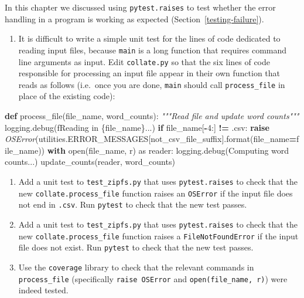 \documentclass[
]{krantz}
\makeatletter
\newenvironment{Shaded}{\begin{snugshade}}{\end{snugshade}}
\newcommand{\BuiltInTok}[1]{#1}
\newcommand{\CommentTok}[1]{\textcolor[rgb]{0.56,0.35,0.01}{\textit{#1}}}
\newcommand{\ControlFlowTok}[1]{\textcolor[rgb]{0.13,0.29,0.53}{\textbf{#1}}}
\newcommand{\DecValTok}[1]{\textcolor[rgb]{0.00,0.00,0.81}{#1}}
\newcommand{\ImportTok}[1]{#1}
\newcommand{\KeywordTok}[1]{\textcolor[rgb]{0.13,0.29,0.53}{\textbf{#1}}}
\newcommand{\NormalTok}[1]{#1}
\newcommand{\OperatorTok}[1]{\textcolor[rgb]{0.81,0.36,0.00}{\textbf{#1}}}
\newcommand{\PreprocessorTok}[1]{\textcolor[rgb]{0.56,0.35,0.01}{\textit{#1}}}
\newcommand{\SpecialCharTok}[1]{\textcolor[rgb]{0.00,0.00,0.00}{#1}}
\newcommand{\SpecialStringTok}[1]{\textcolor[rgb]{0.31,0.60,0.02}{#1}}
\newcommand{\StringTok}[1]{\textcolor[rgb]{0.31,0.60,0.02}{#1}}
\providecommand{\tightlist}{%
  \setlength{\itemsep}{0pt}\setlength{\parskip}{0pt}}
\newenvironment{kframe}{%
\medskip{}
\setlength{\fboxsep}{.8em}
 \def\at@end@of@kframe{}%
 \ifinner\ifhmode%
  \def\at@end@of@kframe{\end{minipage}}%
  \begin{minipage}{\columnwidth}%
 \fi\fi%
 \def\FrameCommand##1{\hskip\@totalleftmargin \hskip-\fboxsep
 \colorbox{shadecolor}{##1}\hskip-\fboxsep
     \hskip-\linewidth \hskip-\@totalleftmargin \hskip\columnwidth}%
 \MakeFramed {\advance\hsize-\width
   \@totalleftmargin\z@ \linewidth\hsize
   \@setminipage}}%
 {\par\unskip\endMakeFramed%
 \at@end@of@kframe}
\renewenvironment{Shaded}{\begin{kframe}}{\end{kframe}}
\makeatother
\begin{document}
In this chapter we discussed using \texttt{pytest.raises}
to test whether the error handling in a program is working as expected (Section~\ref{testing-failure}).

\begin{enumerate}
\def\labelenumi{\arabic{enumi}.}
\tightlist
\item
  It is difficult to write a simple unit test for the lines of code dedicated
  to reading input files, because \texttt{main} is a long function that requires
  command line arguments as input. Edit \texttt{collate.py} so that the six lines of
  code responsible for processing an input file appear in their own function
  that reads as follows (i.e.~once you are done, \texttt{main} should call
  \texttt{process\_file} in place of the existing code):
\end{enumerate}

\begin{Shaded}
\begin{Highlighting}[]
\KeywordTok{def}\NormalTok{ process\_file(file\_name, word\_counts):}
    \CommentTok{"""Read file and update word counts"""}
\NormalTok{    logging.debug(}\SpecialStringTok{f\textquotesingle{}Reading in }\SpecialCharTok{\{}\NormalTok{file\_name}\SpecialCharTok{\}}\SpecialStringTok{...\textquotesingle{}}\NormalTok{)}
    \ControlFlowTok{if}\NormalTok{ file\_name[}\OperatorTok{{-}}\DecValTok{4}\NormalTok{:] }\OperatorTok{!=} \StringTok{\textquotesingle{}.csv\textquotesingle{}}\NormalTok{:}
        \ControlFlowTok{raise} \PreprocessorTok{OSError}\NormalTok{(utilities.ERROR\_MESSAGES[}\StringTok{\textquotesingle{}not\_csv\_file\_suffix\textquotesingle{}}\NormalTok{].}\BuiltInTok{format}\NormalTok{(file\_name}\OperatorTok{=}\NormalTok{file\_name))}
    \ControlFlowTok{with} \BuiltInTok{open}\NormalTok{(file\_name, }\StringTok{\textquotesingle{}r\textquotesingle{}}\NormalTok{) }\ImportTok{as}\NormalTok{ reader:}
\NormalTok{        logging.debug(}\StringTok{\textquotesingle{}Computing word counts...\textquotesingle{}}\NormalTok{)}
\NormalTok{        update\_counts(reader, word\_counts)}
\end{Highlighting}
\end{Shaded}

\begin{enumerate}
\def\labelenumi{\arabic{enumi}.}
\setcounter{enumi}{1}
\item
  Add a unit test to \texttt{test\_zipfs.py} that uses \texttt{pytest.raises} to check that
  the new \texttt{collate.process\_file} function raises an \texttt{OSError} if the input
  file does not end in \texttt{.csv}. Run \texttt{pytest} to check that the new test
  passes.
\item
  Add a unit test to \texttt{test\_zipfs.py} that uses \texttt{pytest.raises} to check that
  the new \texttt{collate.process\_file} function raises a \texttt{FileNotFoundError} if the
  input file does not exist. Run \texttt{pytest} to check that the new test passes.
\item
  Use the \texttt{coverage} library to check that the relevant commands in
  \texttt{process\_file} (specifically \texttt{raise\ OSError} and \texttt{open(file\_name,\ \textquotesingle{}r\textquotesingle{})})
  were indeed tested.
\end{enumerate}
\end{document}
